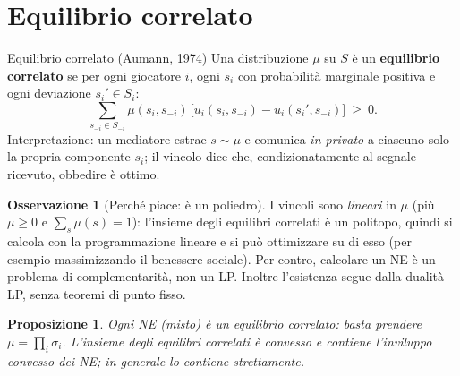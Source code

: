 \documentclass[12pt,a4paper,twoside]{book}
\theoremstyle{plain}
\newtheorem{proposition}[theorem]{Proposizione}
\theoremstyle{definition}
\newtheorem{remark}[theorem]{Osservazione}
\begin{document}
\section{Equilibrio correlato}

\begin{defbox}{Equilibrio correlato (Aumann, 1974)}
Una distribuzione $\mu$ su $S$ è un \textbf{equilibrio correlato} se per ogni
giocatore $i$, ogni $s_i$ con probabilità marginale positiva e ogni deviazione
$s_i'\in S_i$:
\[
  \sum_{s_{-i}\in S_{-i}}\mu(s_i,s_{-i})\,
  \bigl[u_i(s_i,s_{-i})-u_i(s_i',s_{-i})\bigr]\ \ge\ 0 .
\]
Interpretazione: un mediatore estrae $s\sim\mu$ e comunica \emph{in privato} a
ciascuno solo la propria componente $s_i$; il vincolo dice che, condizionatamente
al segnale ricevuto, obbedire è ottimo.
\end{defbox}

\begin{remark}[Perché piace: è un poliedro]
I vincoli sono \emph{lineari} in $\mu$ (più $\mu\ge 0$ e $\sum_s\mu(s)=1$): l'insieme
degli equilibri correlati è un politopo, quindi si calcola con la programmazione
lineare e si può ottimizzare su di esso (per esempio massimizzando il benessere
sociale). Per contro, calcolare un NE è un problema di complementarità, non un LP.
Inoltre l'esistenza segue dalla dualità LP, senza teoremi di punto fisso.
\end{remark}

\begin{proposition}
Ogni NE (misto) è un equilibrio correlato: basta prendere $\mu=\prod_i\sigma_i$.
L'insieme degli equilibri correlati è convesso e contiene l'inviluppo convesso dei
NE; in generale lo contiene \emph{strettamente}.
\end{proposition}
\end{document}
